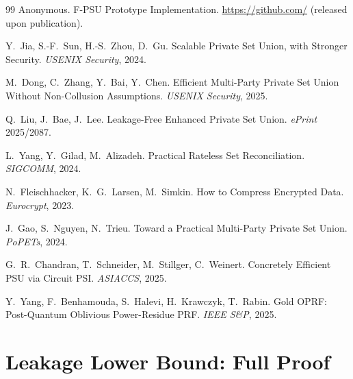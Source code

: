 \documentclass[letterpaper,twocolumn,10pt]{article}
\theoremstyle{definition}
\begin{document}
\begin{thebibliography}{99}
 Anonymous.
\newblock F-PSU Prototype Implementation. \url{https://github.com/} (released upon publication).

 Y.~Jia, S.-F.~Sun, H.-S.~Zhou, D.~Gu.
\newblock Scalable Private Set Union, with Stronger Security. \emph{USENIX Security}, 2024.

 M.~Dong, C.~Zhang, Y.~Bai, Y.~Chen.
\newblock Efficient Multi-Party Private Set Union Without Non-Collusion Assumptions.
\emph{USENIX Security}, 2025.

 Q.~Liu, J.~Bae, J.~Lee.
\newblock Leakage-Free Enhanced Private Set Union. \emph{ePrint} 2025/2087.

 L.~Yang, Y.~Gilad, M.~Alizadeh.
\newblock Practical Rateless Set Reconciliation. \emph{SIGCOMM}, 2024.

 N.~Fleischhacker, K.~G.~Larsen, M.~Simkin.
\newblock How to Compress Encrypted Data. \emph{Eurocrypt}, 2023.

 J.~Gao, S.~Nguyen, N.~Trieu.
\newblock Toward a Practical Multi-Party Private Set Union. \emph{PoPETs}, 2024.

 G.~R.~Chandran, T.~Schneider, M.~Stillger, C.~Weinert.
\newblock Concretely Efficient PSU via Circuit PSI. \emph{ASIACCS}, 2025.

 Y.~Yang, F.~Benhamouda, S.~Halevi, H.~Krawczyk, T.~Rabin.
\newblock Gold OPRF: Post-Quantum Oblivious Power-Residue PRF. \emph{IEEE S\&P}, 2025.

\end{thebibliography}

\newpage
\appendix

\section{Leakage Lower Bound: Full Proof}
\label{sec:lower-proof}
\end{document}

